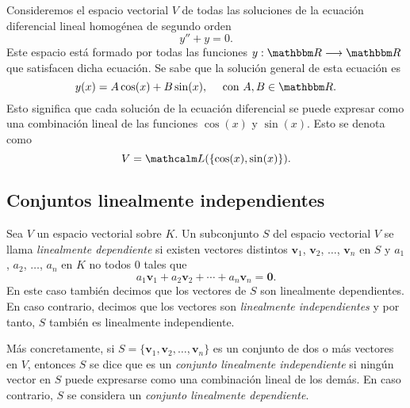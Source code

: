 \begin{examplebox}{}{}
    Consideremos el espacio vectorial $V$ de todas las soluciones de la ecuación diferencial lineal homogénea de segundo orden
    $$y'' + y = 0.$$
    Este espacio está formado por todas las funciones $y: \RR \longrightarrow \RR$ que satisfacen dicha ecuación. Se sabe que la solución general de esta ecuación es
    $$y(x) = A\cos (x) + B\sin (x), \quad \text{ con } A, B \in \RR .$$
    Esto significa que cada solución de la ecuación diferencial se puede expresar como una combinación lineal de las funciones $\cos (x)$ y $\sin (x)$. Esto se denota como
    $$V = \Gen(\{\cos (x), \sin (x)\}).$$
\end{examplebox}

\subsection{Conjuntos linealmente independientes}

\begin{definicion}{}{}
    Sea $V$ un espacio vectorial sobre $K$. Un subconjunto $S$ del espacio vectorial $V$ se llama \emph{linealmente dependiente} si existen vectores distintos $\mathbf{v}_1$, $\mathbf{v}_2$, $\dots$, $\mathbf{v}_n$ en $S$ y $a_1$, $a_2$, $\dots$, $a_n$ en $K$ no todos $0$ tales que
    $$a_1 \mathbf{v}_1 + a_2 \mathbf{v}_2 + \cdots + a_n \mathbf{v}_n = \mathbf{0}.$$
    En este caso también decimos que los vectores de $S$ son linealmente dependientes. En caso contrario, decimos que los vectores son \emph{linealmente independientes} y por tanto, $S$ también es linealmente independiente.
\end{definicion}

Más concretamente, si $S = \{\mathbf{v}_1, \mathbf{v}_2, \dots, \mathbf{v}_n\}$ es un conjunto de dos o más vectores en $V$, entonces $S$ se dice que es un \emph{conjunto linealmente independiente} si ningún vector en $S$ puede expresarse como una combinación lineal de los demás. En caso contrario, $S$ se considera un \emph{conjunto linealmente dependiente}.

\newpage

